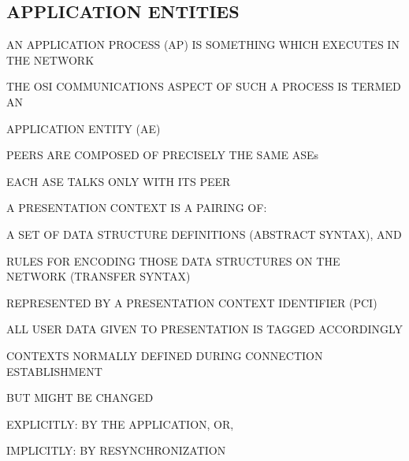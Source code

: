 \begin{bwslide}
\part*	{APPLICATION ENTITIES}\bf

\begin{nrtc}
\item	AN APPLICATION PROCESS (AP) IS SOMETHING WHICH EXECUTES IN THE NETWORK

\item	THE OSI COMMUNICATIONS ASPECT OF SUCH A PROCESS IS TERMED AN
    \begin{nrtc}
    \item	APPLICATION ENTITY (AE)
    \end{nrtc}
\end{nrtc}
\end{bwslide}


\begin{bwslide}

\begin{nrtc}
\item	PEERS ARE COMPOSED OF PRECISELY THE SAME ASEs

\item	EACH ASE TALKS ONLY WITH ITS PEER
\end{nrtc}
\end{bwslide}


\begin{bwslide}

\begin{nrtc}
\item	A PRESENTATION CONTEXT IS A PAIRING OF:
    \begin{nrtc}
    \item	A SET OF DATA STRUCTURE DEFINITIONS (ABSTRACT SYNTAX), AND

    \item	RULES FOR ENCODING THOSE DATA STRUCTURES ON THE NETWORK 
		(TRANSFER SYNTAX)
    \end{nrtc}

\item	REPRESENTED BY A PRESENTATION CONTEXT IDENTIFIER (PCI)

\item	ALL USER DATA GIVEN TO PRESENTATION IS TAGGED ACCORDINGLY

\item	CONTEXTS NORMALLY DEFINED DURING CONNECTION ESTABLISHMENT

\item	BUT MIGHT BE CHANGED
    \begin{nrtc}
    \item	EXPLICITLY: BY THE APPLICATION, OR,

    \item	IMPLICITLY: BY RESYNCHRONIZATION
    \end{nrtc}
\end{nrtc}
\end{bwslide}


